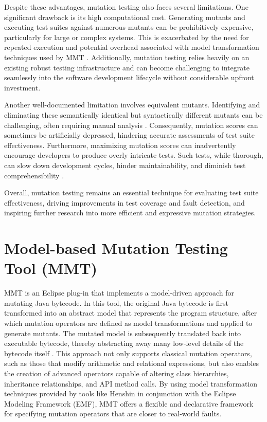 \documentclass[sigplan, nonacm]{acmart}
\begin{document}
Despite these advantages, mutation testing also faces several limitations. One significant drawback is its high computational cost. Generating mutants and executing test suites against numerous mutants can be prohibitively expensive, particularly for large or complex systems. This is exacerbated by the need for repeated execution and potential overhead associated with model transformation techniques used by MMT \cite{bockisch_mutation_2024}. Additionally, mutation testing relies heavily on an existing robust testing infrastructure and can become challenging to integrate seamlessly into the software development lifecycle without considerable upfront investment.

Another well-documented limitation involves equivalent mutants. Identifying and eliminating these semantically identical but syntactically different mutants can be challenging, often requiring manual analysis \cite{jia_analysis_2011}. Consequently, mutation scores can sometimes be artificially depressed, hindering accurate assessments of test suite effectiveness. Furthermore, maximizing mutation scores can inadvertently encourage developers to produce overly intricate tests. Such tests, while thorough, can slow down development cycles, hinder maintainability, and diminish test comprehensibility \cite{offutt_mutation_2001,jia_analysis_2011}.

Overall, mutation testing remains an essential technique for evaluating test suite effectiveness, driving improvements in test coverage and fault detection, and inspiring further research into more efficient and expressive mutation strategies.

\section{Model-based Mutation Testing Tool (MMT)}
MMT is an Eclipse plug-in that implements a model-driven approach for mutating Java bytecode. In this tool, the original Java bytecode is first transformed into an abstract model that represents the program structure, after which mutation operators are defined as model transformations and applied to generate mutants. The mutated model is subsequently translated back into executable bytecode, thereby abstracting away many low-level details of the bytecode itself \cite{bockisch_mmt_2024, bockisch_mutation_2024}. This approach not only supports classical mutation operators, such as those that modify arithmetic and relational expressions, but also enables the creation of advanced operators capable of altering class hierarchies, inheritance relationships, and API method calls. By using model transformation techniques provided by tools like Henshin in conjunction with the Eclipse Modeling Framework (EMF), MMT offers a flexible and declarative framework for specifying mutation operators that are closer to real-world faults.
\end{document}
